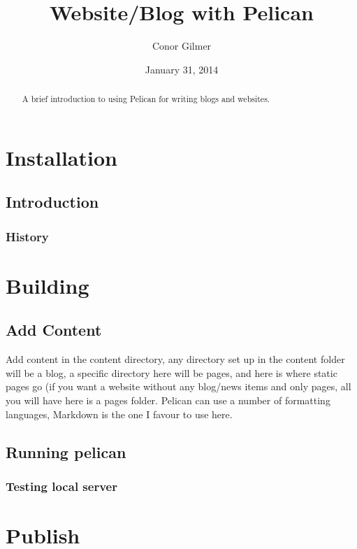\documentclass[]{report}   %
\begin{document}
\title{Website/Blog with Pelican}   %
\author{Conor Gilmer}         %
\date{January 31, 2014}    %
\maketitle

\begin{abstract}
  A brief introduction to using Pelican for writing blogs and websites.
\end{abstract}

\chapter{Installation}             %
\section{Introduction}     %
\subsection{History}       %

\chapter{Building}           %
\section{Add Content}
Add content in the content directory, any directory set up in the content folder will be a blog, a specific directory here will be pages, and here is where static pages go (if you want a website without any blog/news items and only pages, all you will have here is a pages folder.
Pelican can use a number of formatting languages, Markdown is the one I favour to use here. 
\section{Running pelican}     %


\subsection{Testing local server}         %


\chapter{Publish}           %
\end{document}
